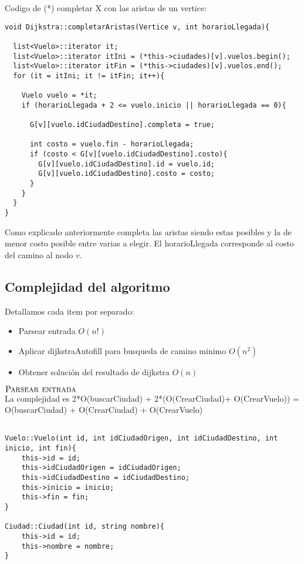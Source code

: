 \noindent
Codigo de (*) completar X con las aristas de un vertice:

\begin{lstlisting}
void Dijkstra::completarAristas(Vertice v, int horarioLlegada){

  list<Vuelo>::iterator it;
  list<Vuelo>::iterator itIni = (*this->ciudades)[v].vuelos.begin();
  list<Vuelo>::iterator itFin = (*this->ciudades)[v].vuelos.end();
  for (it = itIni; it != itFin; it++){
    
    Vuelo vuelo = *it;
    if (horarioLlegada + 2 <= vuelo.inicio || horarioLlegada == 0){

      G[v][vuelo.idCiudadDestino].completa = true;

      int costo = vuelo.fin - horarioLlegada;
      if (costo < G[v][vuelo.idCiudadDestino].costo){
        G[v][vuelo.idCiudadDestino].id = vuelo.id;
        G[v][vuelo.idCiudadDestino].costo = costo;
      }
    }
  }
}
\end{lstlisting}

\noindent
Como explicado anteriormente completa las aristas siendo estas posibles y la de menor costo posible entre varias a elegir. El horarioLlegada corresponde al costo del camino al nodo $v$.
\bigskip

\subsection{Complejidad del algoritmo}

Detallamos cada item por separado:

\begin{itemize}
\item Parsear entrada $O(n!)$
\item Aplicar dijkstraAutofill para busqueda de camino minimo $O(n^2)$
\item Obtener soluci\'on del resultado de dijkstra $O(n)$
\end{itemize}


\noindent
$\textnormal{\scshape Parsear entrada}$ \\
La complejidad es 2*O(buscarCiudad) + 2*(O(CrearCiudad)+ O(CrearVuelo)) = O(buscarCiudad) + O(CrearCiudad) + O(CrearVuelo)


\begin{lstlisting}

Vuelo::Vuelo(int id, int idCiudadOrigen, int idCiudadDestino, int inicio, int fin){
	this->id = id;
	this->idCiudadOrigen = idCiudadOrigen;
	this->idCiudadDestino = idCiudadDestino;
	this->inicio = inicio;
	this->fin = fin;
}

Ciudad::Ciudad(int id, string nombre){
	this->id = id;
	this->nombre = nombre;
}

\end{lstlisting}

